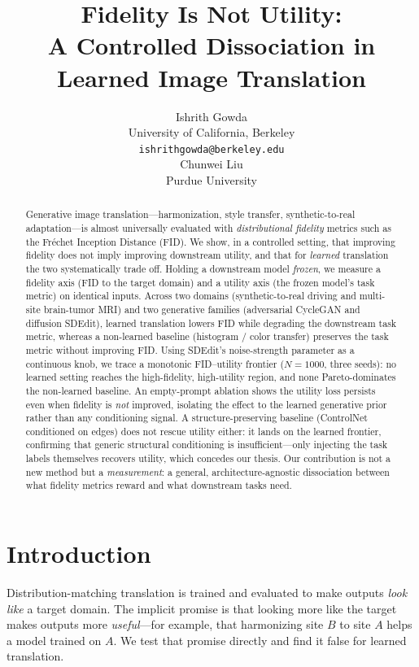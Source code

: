 \documentclass{article}
\title{Fidelity Is Not Utility:\\ A Controlled Dissociation in Learned Image Translation}
\author{%
  Ishrith Gowda\\
  University of California, Berkeley\\
  \texttt{ishrithgowda@berkeley.edu}\\
  \And
  Chunwei Liu\\
  Purdue University\\
}
\date{}
\begin{document}
\maketitle

\begin{abstract}
Generative image translation---harmonization, style transfer, synthetic-to-real
adaptation---is almost universally evaluated with \emph{distributional fidelity}
metrics such as the Fr\'echet Inception Distance (FID). We show, in a controlled
setting, that improving fidelity does not imply improving downstream utility, and
that for \emph{learned} translation the two systematically trade off. Holding a
downstream model \emph{frozen}, we measure a fidelity axis (FID to the target
domain) and a utility axis (the frozen model's task metric) on identical inputs.
Across two domains (synthetic-to-real driving and multi-site brain-tumor MRI) and
two generative families (adversarial CycleGAN and diffusion SDEdit), learned
translation lowers FID while degrading the downstream task metric, whereas a
non-learned baseline (histogram / color transfer) preserves the task metric
without improving FID. Using SDEdit's noise-strength parameter as a continuous
knob, we trace a monotonic FID--utility frontier ($N{=}1000$, three seeds): no
learned setting reaches the high-fidelity, high-utility region, and none
Pareto-dominates the non-learned baseline. An empty-prompt ablation shows the
utility loss persists even when fidelity is \emph{not} improved, isolating the
effect to the learned generative prior rather than any conditioning signal. A
structure-preserving baseline (ControlNet conditioned on edges) does not rescue
utility either: it lands on the learned frontier, confirming that generic
structural conditioning is insufficient---only injecting the task labels
themselves recovers utility, which concedes our thesis. Our contribution is not a
new method but a \emph{measurement}: a general, architecture-agnostic dissociation
between what fidelity metrics reward and what downstream tasks need.
\end{abstract}

\section{Introduction}
Distribution-matching translation is trained and evaluated to make outputs
\emph{look like} a target domain. The implicit promise is that looking more like
the target makes outputs more \emph{useful}---for example, that harmonizing site
$B$ to site $A$ helps a model trained on $A$. We test that promise directly and
find it false for learned translation.
\end{document}
